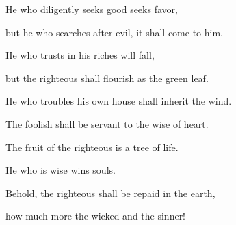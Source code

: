 {\par }{\Q {}He who diligently seeks good seeks favor,
\par }{\QB but he who searches after evil, it shall come to him.
\par }{\Q {}He who trusts in his riches will fall,
\par }{\QB but the righteous shall flourish as the green leaf.
\par }{\Q {}He who troubles his own house shall inherit the wind.
\par }{\QB The foolish shall be servant to the wise of heart.
\par }{\Q {}The fruit of the righteous is a tree of life.
\par }{\QB He who is wise wins souls.
\par }{\Q {}Behold, the righteous shall be repaid in the earth,
\par }{\QB how much more the wicked and the sinner!

}
